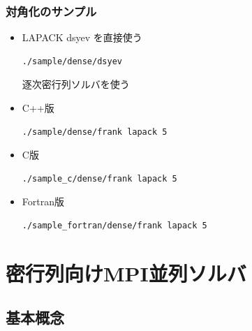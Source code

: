 \begin{frame}[c,fragile]
  \frametitle{対角化のサンプル}
  \begin{itemize}
  \item LAPACK dsyev を直接使う 
\begin{lstlisting}[style=shstyle]
./sample/dense/dsyev
\end{lstlisting}
逐次密行列ソルバを使う
  \item C++版 
\begin{lstlisting}[style=shstyle]
./sample/dense/frank lapack 5
\end{lstlisting}
  \item C版 
\begin{lstlisting}[style=shstyle]
./sample_c/dense/frank lapack 5
\end{lstlisting}
  \item Fortran版 
\begin{lstlisting}[style=shstyle]
./sample_fortran/dense/frank lapack 5
\end{lstlisting}
  \end{itemize}
\end{frame}

\section{密行列向けMPI並列ソルバ}

\subsection{基本概念}


